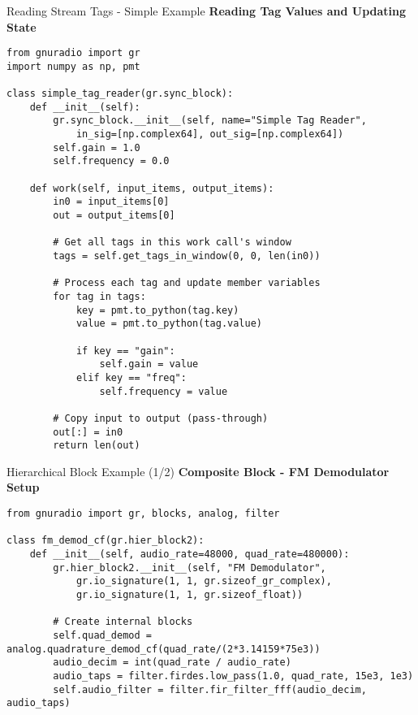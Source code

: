 \documentclass[aspectratio=169,11pt]{beamer}
\begin{document}
\begin{frame}[fragile]{Reading Stream Tags - Simple Example}
\textbf{Reading Tag Values and Updating State}
\tiny
\begin{verbatim}
from gnuradio import gr
import numpy as np, pmt

class simple_tag_reader(gr.sync_block):
    def __init__(self):
        gr.sync_block.__init__(self, name="Simple Tag Reader",
            in_sig=[np.complex64], out_sig=[np.complex64])
        self.gain = 1.0
        self.frequency = 0.0
        
    def work(self, input_items, output_items):
        in0 = input_items[0]
        out = output_items[0]
        
        # Get all tags in this work call's window
        tags = self.get_tags_in_window(0, 0, len(in0))
        
        # Process each tag and update member variables
        for tag in tags:
            key = pmt.to_python(tag.key)
            value = pmt.to_python(tag.value)
            
            if key == "gain":
                self.gain = value
            elif key == "freq":
                self.frequency = value
        
        # Copy input to output (pass-through)
        out[:] = in0
        return len(out)
\end{verbatim}
\end{frame}

\begin{frame}[fragile]{Hierarchical Block Example (1/2)}
\textbf{Composite Block - FM Demodulator Setup}
\tiny
\begin{verbatim}
from gnuradio import gr, blocks, analog, filter

class fm_demod_cf(gr.hier_block2):
    def __init__(self, audio_rate=48000, quad_rate=480000):
        gr.hier_block2.__init__(self, "FM Demodulator",
            gr.io_signature(1, 1, gr.sizeof_gr_complex),
            gr.io_signature(1, 1, gr.sizeof_float))
        
        # Create internal blocks
        self.quad_demod = analog.quadrature_demod_cf(quad_rate/(2*3.14159*75e3))
        audio_decim = int(quad_rate / audio_rate)
        audio_taps = filter.firdes.low_pass(1.0, quad_rate, 15e3, 1e3)
        self.audio_filter = filter.fir_filter_fff(audio_decim, audio_taps)
\end{verbatim}
\end{frame}
\end{document}
